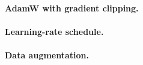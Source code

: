 \documentclass[11pt,a4paper]{article}
\begin{document}
\paragraph{AdamW with gradient clipping.}


\paragraph{Learning-rate schedule.}


\paragraph{Data augmentation.}

\end{document}

